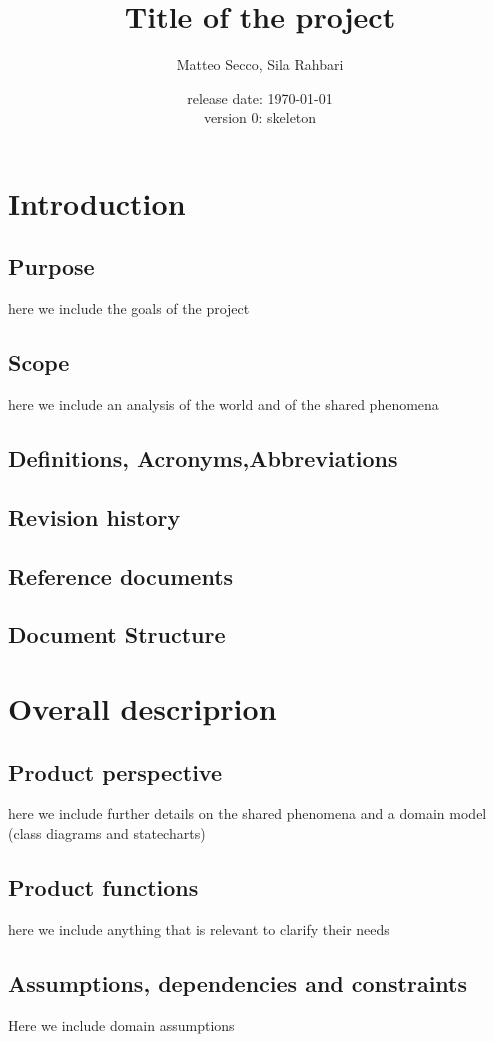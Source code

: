 \documentclass{article}
\title{Title of the project}
\date{release date: \today\\version 0: skeleton}
\author{Matteo Secco, Sila Rahbari}
\begin{document}
\maketitle
\newpage
\tableofcontents
\newpage
{}
\section{Introduction}
	\subsection{Purpose} here we	 include	 the	 goals of the project	
	\subsection{Scope} here we include an analysis of the world and of the shared phenomena
	\subsection{Definitions, Acronyms,Abbreviations}
	\subsection{Revision history}
	\subsection{Reference documents}
	\subsection{Document Structure}
\section{Overall descriprion}
	\subsection{Product perspective} here we include further details on the shared phenomena and a domain model (class diagrams and statecharts)
	\subsection{Product functions}here we include anything that is relevant to clarify their needs
	\subsection{Assumptions, dependencies and constraints} Here we include domain assumptions
\end{document}
